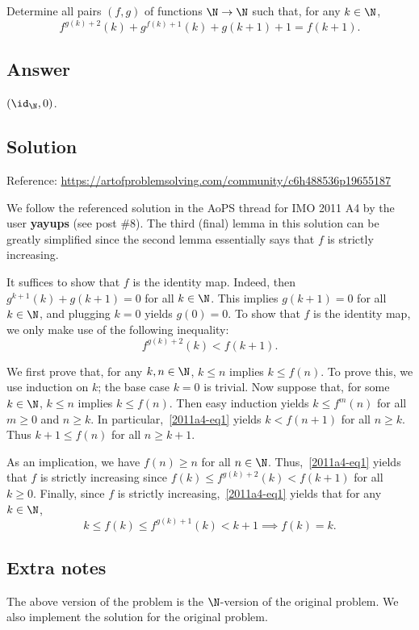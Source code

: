 Determine all pairs $(f, g)$ of functions $\N \to \N$ such that, for any $k \in \N$,
\[ f^{g(k) + 2}(k) + g^{f(k) + 1}(k) + g(k + 1) + 1 = f(k + 1). \]



\subsection*{Answer}

$(\id_{\N}, 0)$.



\subsection*{Solution}

Reference: \url{https://artofproblemsolving.com/community/c6h488536p19655187}

We follow the referenced solution in the AoPS thread for IMO 2011 A4 by the user \textbf{yayups} (see post \#8).
The third (final) lemma in this solution can be greatly simplified since the second lemma essentially says that $f$ is strictly increasing.

It suffices to show that $f$ is the identity map.
Indeed, then $g^{k + 1}(k) + g(k + 1) = 0$ for all $k \in \N$.
This implies $g(k + 1) = 0$ for all $k \in \N$, and plugging $k = 0$ yields $g(0) = 0$.
To show that $f$ is the identity map, we only make use of the following inequality:
\[ f^{g(k) + 2}(k) < f(k + 1). \tag{1}\label{2011a4-eq1} \]

We first prove that, for any $k, n \in \N$, $k \leq n$ implies $k \leq f(n)$.
To prove this, we use induction on $k$; the base case $k = 0$ is trivial.
Now suppose that, for some $k \in \N$, $k \leq n$ implies $k \leq f(n)$.
Then easy induction yields $k \leq f^m(n)$ for all $m \geq 0$ and $n \geq k$.
In particular,~\eqref{2011a4-eq1} yields $k < f(n + 1)$ for all $n \geq k$.
Thus $k + 1 \leq f(n)$ for all $n \geq k + 1$.

As an implication, we have $f(n) \geq n$ for all $n \in \N$.
Thus,~\eqref{2011a4-eq1} yields that $f$ is strictly increasing since $f(k) \leq f^{g(k) + 2}(k) < f(k + 1)$ for all $k \geq 0$.
Finally, since $f$ is strictly increasing,~\eqref{2011a4-eq1} yields that for any $k \in \N$,
\[ k \leq f(k) \leq f^{g(k) + 1}(k) < k + 1 \implies f(k) = k. \]



\subsection*{Extra notes}

The above version of the problem is the $\N$-version of the original problem.
We also implement the solution for the original problem.
